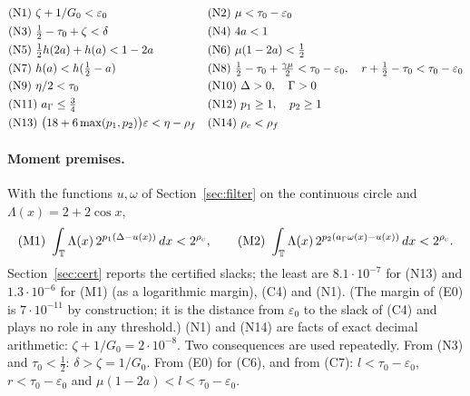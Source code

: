 \documentclass[11pt]{article}
\theoremstyle{definition}
\newcommand{\Tc}{\mathbb T}
\newcommand{\eps}{\varepsilon}
\begin{document}
\begin{align*}
&\textup{(N1)}\ \zeta+1/G_0<\eps_0 &&\textup{(N2)}\ \mu<\tau_0-\eps_0\\
&\textup{(N3)}\ \tfrac12-\tau_0+\zeta<\delta &&\textup{(N4)}\ 4a<1\\
&\textup{(N5)}\ \tfrac12h(2a)+h(a)<1-2a &&\textup{(N6)}\ \mu(1-2a)<\tfrac12\\
&\textup{(N7)}\ h(a)<h(\tfrac12-a) &&\textup{(N8)}\ \tfrac12-\tau_0+\tfrac{\gamma\mu}2<\tau_0-\eps_0,\quad r+\tfrac12-\tau_0<\tau_0-\eps_0\\
&\textup{(N9)}\ \eta/2<\tau_0 &&\textup{(N10)}\ \Delta>0,\quad\Gamma>0\\
&\textup{(N11)}\ a_\Gamma\le\tfrac34 &&\textup{(N12)}\ p_1\ge1,\quad p_2\ge1\\
&\textup{(N13)}\ \bigl(18+6\max(p_1,p_2)\bigr)\eps<\eta-\rho_f &&\textup{(N14)}\ \rho_c<\rho_f
\end{align*}
\paragraph{Moment premises.} With the functions $u,\omega$ of Section~\ref{sec:filter} on the continuous circle and
$\Lambda(x)=2+2\cos x$,
\[
\textup{(M1)}\ \int_{\Tc}\Lambda(x)\,2^{p_1(\Delta-u(x))}\,dx<2^{\rho_c},\qquad
\textup{(M2)}\ \int_{\Tc}\Lambda(x)\,2^{p_2(a_\Gamma\omega(x)-u(x))}\,dx<2^{\rho_c}.
\]
Section~\ref{sec:cert} reports the certified slacks; the least are $8.1\cdot10^{-7}$ for \textup{(N13)} and
$1.3\cdot10^{-6}$ for \textup{(M1)} (as a logarithmic margin), \textup{(C4)} and \textup{(N1)}. (The margin of \textup{(E0)} is
$7\cdot10^{-11}$ by construction; it is the distance from $\eps_0$ to the slack of \textup{(C4)} and plays no role
in any threshold.) \textup{(N1)} and \textup{(N14)} are facts of exact decimal arithmetic:
$\zeta+1/G_0=2\cdot10^{-8}$.
Two consequences are used repeatedly. From \textup{(N3)} and $\tau_0<\tfrac12$: $\delta>\zeta=1/G_0$. From
\textup{(E0)} for \textup{(C6)}, and from \textup{(C7)}: $l<\tau_0-\eps_0$, $r<\tau_0-\eps_0$ and
$\mu(1-2a)<l<\tau_0-\eps_0$.
\end{document}
